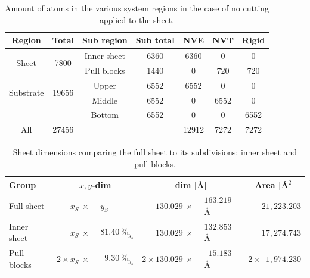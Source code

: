 \begin{table}[H]
  \begin{center}
  \caption{Amount of atoms in the various system regions in the case of no cutting applied to the sheet.}
  \label{tab:system_count}
  \begin{tabular}{ |c|| c | c | c | c | c | c |} \hline
    \textbf{Region} & \textbf{Total}  & Sub region & Sub total & \textbf{NVE} &
    \textbf{NVT} & \textbf{Rigid} \\ \hline   
    \multirow{2}{*}{Sheet} & \multirow{2}{*}{7800} & Inner sheet & 6360 & 6360 &
    0 & 0 \\ %
    & & Pull blocks & 1440 & 0 & 720 & 720 \\ \hline   
    \multirow{2}{*}{Substrate} & \multirow{2}{*}{19656} & Upper & 6552 & 6552 &
    0 & 0 \\ %
    & & Middle & 6552 & 0 & 6552 & 0 \\ %
    & & Bottom & 6552 & 0 & 0 & 6552 \\ \hline \hline   
    All & 27456 & \multicolumn{2}{r|}{} & 12912 & 7272 & 7272 \\ \hline 
  \end{tabular}
  \end{center}
\end{table}


\begin{table}[H]
  \begin{center}
  \caption{Sheet dimensions comparing the full sheet to its subdivisions: inner sheet and pull blocks.}
  \label{tab:sheet_dim}
  \begin{tabular}{ | l | r@{}l | r@{}l | c |} \hline
    \textbf{Group} & \multicolumn{2}{c|}{$x,y$-dim} & \multicolumn{2}{c|}{dim
    [Å]} & Area [Å$^2$]\\ \hline
  Full sheet & $x_S \: \times \: $ & $y_S$ &  $130.029 \: \times \:$ & $163.219$
  Å & $\phantom{2\times} 21,223.203$ \\ \hline
  Inner sheet & $x_S \: \times \:$ & $81.40 \ \%_{y_s}$ &  $130.029  \: \times
  \:$ & $132.853$ Å & $\phantom{2\times} 17,274.743$\\ \hline
  Pull blocks & $2 \times x_S \: \times \:$ & $ \phantom{0}9.30 \ \%_{y_s}$ & $2
  \times 130.029  \: \times \: $ & $\phantom{0}15.183$ Å  & $2 \times
  \phantom{0}1,974.230$ \\ \hline  
  \end{tabular}
  \end{center}
\end{table}


